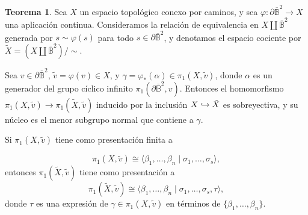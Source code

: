 \documentclass[10pt]{report}
\DeclareMathOperator{\interior}{Int} %
\theoremstyle{definition}
\newtheorem{tma}[defin]{Teorema}
\begin{document}
\begin{tma}\label{teo:2celda}
Sea $X$ un espacio topológico conexo por caminos, y sea $\varphi: \partial \overline{\mathbb{B}}^2 \to X$ una aplicación continua. Consideramos la relación de equivalencia en $X \amalg \overline{\mathbb{B}}^2$ generada por $s \sim \varphi(s)$ para todo $s\in  \partial \overline{\mathbb{B}}^2$, y denotamos el espacio cociente por $\tilde{X}= (X \amalg  \overline{\mathbb{B}}^2) / \sim$.


Sea $v\in \partial \overline{\mathbb{B}}^2$, $\tilde{v} =\varphi (v) \in X$, y $\gamma =\varphi_* (\alpha ) \in \pi_1 (X, \tilde{v})$, donde $\alpha$ es un generador del grupo cíclico infinito $\pi_1 (\partial \overline{\mathbb{B}}^2 , v)$. Entonces el homomorfismo $\pi_1 (X, \tilde{v})\to \pi_1 (\tilde{X}, \tilde{v})$ inducido por la inclusión $X \xhookrightarrow{} \tilde{X}$ es sobreyectiva, y su núcleo es el menor subgrupo normal que contiene a $\gamma$. 

Si $\pi_1 (X, \tilde{v})$ tiene como presentación finita a 

\[
\pi_1(X, \tilde{v}) \cong \langle \beta_1 , \dots , \beta_n \mid \sigma_1 , \dots ,\sigma_s \rangle ,
\]
entonces $\pi_1 (\tilde{X}, \tilde{v} )$ tiene como presentación a 
\[
\pi_1(\tilde{X}, \tilde{v}) \cong \langle \beta_1 , \dots , \beta_n \mid \sigma_1 , \dots ,\sigma_s , \tau \rangle ,
\]
donde $\tau$ es una expresión de $\gamma \in \pi_1(X, \tilde{v})$ en términos de   $\{ \beta_1 , \dots ,\beta_n \}$.
\end{tma}
\end{document}
